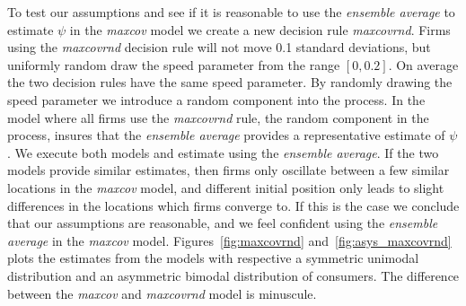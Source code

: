 \documentclass[preprint, 12pt]{elsarticle}
\begin{document}
To test our assumptions and see if it is reasonable to use the \emph{ensemble average} to estimate $\psi$ in the \emph{maxcov} model we create a new decision rule \emph{maxcovrnd}. Firms using the \emph{maxcovrnd} decision rule will not move 0.1 standard deviations, but uniformly random draw the speed parameter from the range $[0, 0.2]$. On average the two decision rules have the same speed parameter. By randomly drawing the speed parameter we introduce a random component into the process. In the model where all firms use the \emph{maxcovrnd} rule, the random component in the process, insures that the \emph{ensemble average} provides a representative estimate of $\psi$. We execute both models and estimate using the \emph{ensemble average}. If the two models provide similar estimates, then firms only oscillate between a few similar locations in the \emph{maxcov} model, and different initial position only leads to slight differences in the locations which firms converge to. If this is the case we conclude that our assumptions are reasonable, and we feel confident using the \emph{ensemble average} in the \emph{maxcov} model. Figures~\ref{fig:maxcovrnd} and~\ref{fig:asys_maxcovrnd} plots the estimates from the models with respective a symmetric unimodal distribution and an asymmetric bimodal distribution of consumers. The difference between the \emph{maxcov} and \emph{maxcovrnd} model is minuscule.
\end{document}
